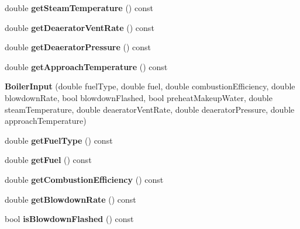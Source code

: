 \begin{DoxyCompactItemize}
\item 
\mbox{\label{class_boiler_input_aec0859643e7edf458fe40685d29a67f8}} 
double {\bfseries get\+Steam\+Temperature} () const
\item 
\mbox{\label{class_boiler_input_a95ad03651a9b5caac6c8cd8e19e76a0b}} 
double {\bfseries get\+Deaerator\+Vent\+Rate} () const
\item 
\mbox{\label{class_boiler_input_a74475254323b0d3ebe8636a45437366f}} 
double {\bfseries get\+Deaerator\+Pressure} () const
\item 
\mbox{\label{class_boiler_input_a0c458f1838e99f98f5eaf5c9217b1033}} 
double {\bfseries get\+Approach\+Temperature} () const
\item 
\mbox{\label{class_boiler_input_aa0f215112228b7406daa0f7a1adcb64b}} 
{\bfseries Boiler\+Input} (double fuel\+Type, double fuel, double combustion\+Efficiency, double blowdown\+Rate, bool blowdown\+Flashed, bool preheat\+Makeup\+Water, double steam\+Temperature, double deaerator\+Vent\+Rate, double deaerator\+Pressure, double approach\+Temperature)
\item 
\mbox{\label{class_boiler_input_a128aabf791e419378f48600119685bd1}} 
double {\bfseries get\+Fuel\+Type} () const
\item 
\mbox{\label{class_boiler_input_a33ddf0d6523d3acc0f40f36ae0a0e71f}} 
double {\bfseries get\+Fuel} () const
\item 
\mbox{\label{class_boiler_input_a4e84b0ba74ba445ef12c5b53a759ae3d}} 
double {\bfseries get\+Combustion\+Efficiency} () const
\item 
\mbox{\label{class_boiler_input_a5257376f2baa0fb06719c3fd7adb841e}} 
double {\bfseries get\+Blowdown\+Rate} () const
\item 
\mbox{\label{class_boiler_input_a9821b82ca30068ed1f8dc9cc1377c449}} 
bool {\bfseries is\+Blowdown\+Flashed} () const
\item 
\mbox{\label{class_boiler_input_a72cde34ac73269a7018859e601629777}} 

\end{DoxyCompactItemize}
